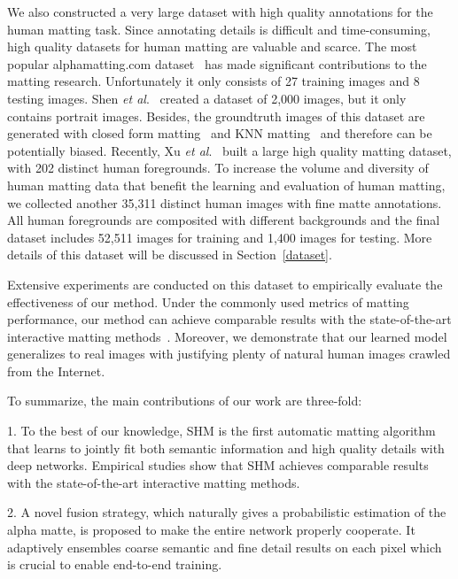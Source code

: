 We also constructed a very large dataset with high quality annotations for the human matting task.
Since annotating details is difficult and time-consuming, high quality datasets for human matting are valuable and scarce.
The most popular alphamatting.com dataset~\cite{rhemann2009perceptually} has made significant contributions to the matting research. Unfortunately it only consists of 27 training images and 8 testing images.
Shen \emph{et al}.~\cite{shen2016deep} created a dataset of 2,000 images, but it only contains portrait images.
Besides, the groundtruth images of this dataset are generated with closed form matting~\cite{rhemann2009perceptually} and KNN matting~\cite{chen2013knn} and therefore can be potentially biased.
Recently, Xu \emph{et al}.~\cite{xu2017deep} built a large high quality matting dataset, with 202 distinct human foregrounds.
To increase the volume and diversity of human matting data that benefit the learning and evaluation of human matting, we collected another 35,311 distinct human images with fine matte annotations.
All human foregrounds are composited with different backgrounds and the final dataset includes 52,511 images for training and 1,400 images for testing.
More details of this dataset will be discussed in Section~\ref{dataset}.





Extensive experiments are conducted on this dataset to empirically evaluate the effectiveness of our method.
Under the commonly used metrics of matting performance, our method can achieve comparable results with the state-of-the-art interactive matting methods~\cite{levin2008closed,chen2013knn,aksoy2017designing,xu2017deep}.
Moreover, we demonstrate that our learned model generalizes to real images with justifying plenty of natural human images crawled from the Internet.

To summarize, the main contributions of our work are three-fold:

1. To the best of our knowledge, SHM is the first automatic matting algorithm that learns to jointly fit both semantic information and high quality details with deep networks.
Empirical studies show that SHM achieves comparable results with the state-of-the-art interactive matting methods.

2. A novel fusion strategy, which naturally gives a probabilistic estimation of the alpha matte, is proposed to make the entire network properly cooperate.
It adaptively ensembles coarse semantic and fine detail results on each pixel which is crucial to enable end-to-end training.

